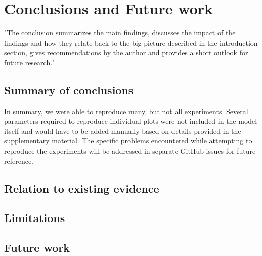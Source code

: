 \section*{Conclusions and Future work}

"The conclusion summarizes the main findings, discusses the impact of the findings and
how they relate back to the big picture described in the introduction section, gives
recommendations by the author and provides a short outlook for future research."

\subsection*{Summary of conclusions}
In summary, we were able to reproduce many, but not all experiments. Several parameters required to reproduce individual plots were not included in the model itself and would have to be added manually based on details provided in the supplementary material. The specific problems encountered while attempting to reproduce the experiments will be addressed in separate GitHub issues for future reference. 

\subsection*{Relation to existing evidence}

\subsection*{Limitations}

\subsection*{Future work}

